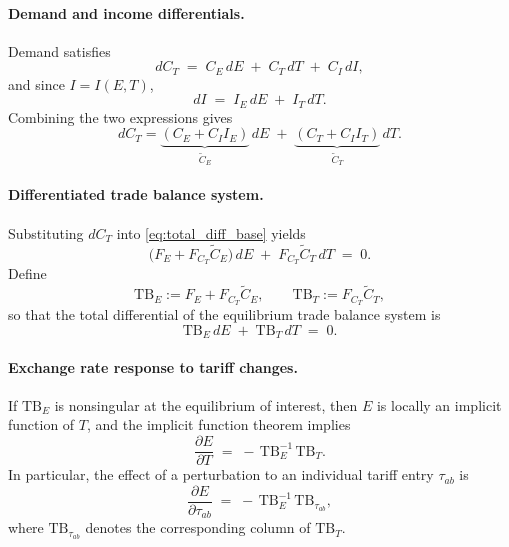 \documentclass[11pt]{article}
\begin{document}
\paragraph{Demand and income differentials.}
Demand satisfies
\begin{equation}
    dC_T
    \;=\;
    C_E \, dE
    \;+\;
    C_T \, dT
    \;+\;
    C_I \, dI,
\end{equation}
and since $I = I(E,T)$,
\begin{equation}
    dI
    \;=\;
    I_E \, dE
    \;+\;
    I_T \, dT.
\end{equation}
Combining the two expressions gives
\begin{equation}
    dC_T
    =
    \underbrace{(C_E + C_I I_E)}_{\tilde{C}_E}\, dE
    \;+\;
    \underbrace{(C_T + C_I I_T)}_{\tilde{C}_T}\, dT.
\end{equation}

\paragraph{Differentiated trade balance system.}
Substituting $dC_T$ into \eqref{eq:total_diff_base} yields
\begin{equation}
    \big(F_E + F_{C_T}\tilde{C}_E\big)\, dE
    \;+\;
    F_{C_T} \tilde{C}_T \, dT
    \;=\;
    0.
\end{equation}
Define
\begin{equation}
    \mathrm{TB}_E := F_E + F_{C_T} \tilde{C}_E,
    \qquad
    \mathrm{TB}_T := F_{C_T} \tilde{C}_T,
\end{equation}
so that the total differential of the equilibrium trade balance system is
\begin{equation}
    \mathrm{TB}_E \, dE \;+\; \mathrm{TB}_T \, dT \;=\; 0.
\end{equation}

\paragraph{Exchange rate response to tariff changes.}
If $\mathrm{TB}_E$ is nonsingular at the equilibrium of interest, then $E$
is locally an implicit function of $T$, and the implicit function theorem
implies
\begin{equation}
    \frac{\partial E}{\partial T}
    \;=\;
    - \, \mathrm{TB}_E^{-1}\, \mathrm{TB}_T.
\end{equation}
In particular, the effect of a perturbation to an individual tariff entry
$\tau_{ab}$ is
\begin{equation}
    \frac{\partial E}{\partial \tau_{ab}}
    \;=\;
    - \, \mathrm{TB}_E^{-1}\, \mathrm{TB}_{\tau_{ab}},
\end{equation}
where $\mathrm{TB}_{\tau_{ab}}$ denotes the corresponding column of 
$\mathrm{TB}_T$.
\end{document}
